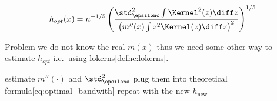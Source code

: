 \begin{corbox}\nospacing
    \begin{cor}\label{cor:the_optimal_bandwidth}
        \begin{align}
          h_{opt}(x)=n^{-1/5}\left(\frac{\std_{\epsilonc}^{2}\int\Kernel^{2}(z)\diff z}{\left(m''(x)\int z^{2}\Kernel(z)\diff z\right)^{2}}\right)^{1/5}\label{eq:optimal_bandwith}
        \end{align}
    \end{cor}
\end{corbox}
\begin{sectionbox}\nospacing
  Problem we do not know the real $m(x)$ thus we need some other way to estimate $h_{opt}$ i.e.\ using lokerns\cref{defnc:lokerns}.
\end{sectionbox}
\begin{algorithmbox}\nospacing
    \begin{algo}\leavevmode
        \begin{algorithmic}[1]
            \item[] 
                \State estimate $m''(\cdot)$ and $\std_{\epsilonc}^{2}$
                \State plug them into theoretical formula\cref{eq:optimal_bandwith}
                \State repeat with the new $h_{\text{new}}$
            \EndFor
        \end{algorithmic}
    \end{algo}
\end{algorithmbox}

